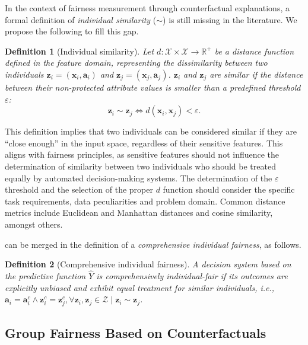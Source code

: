 \documentclass[letterpaper]{article} %
\newtheorem{definition}{Definition}
\begin{document}
In the context of fairness measurement through counterfactual explanations, a formal definition of \emph{individual similarity} ($\sim$) is still missing in the literature. We propose the following to fill this gap.
%
\begin{definition}[Individual similarity]\label{similar_individuals}
	Let $d: \mathcal{X} \times \mathcal{X} \rightarrow \mathbb{R}^{+}$ be a distance function defined in the feature domain, representing the dissimilarity between two individuals $\boldsymbol{z}_i = (\boldsymbol{x}_i, \boldsymbol{a}_i)$ and $\boldsymbol{z}_j = (\boldsymbol{x}_j, \boldsymbol{a}_j)$.
	$\boldsymbol{z}_i$ and $\boldsymbol{z}_j$ are similar if the distance between their non-protected attribute values is smaller than a predefined threshold $\varepsilon$:
	$$ \boldsymbol{z}_i \sim \boldsymbol{z}_j \iff d(\boldsymbol{x}_i, \boldsymbol{x}_j) < \varepsilon. $$
\end{definition}
%
\noindent This definition implies that two individuals can be considered similar if they are ``close enough'' in the input space, regardless of their sensitive features. This aligns with fairness principles, as sensitive features should not influence the determination of similarity between two individuals who should be treated equally by automated decision-making systems.
%
The determination of the $\varepsilon$ threshold and the selection of the proper $d$ function should consider the specific task requirements, data peculiarities and problem domain. Common distance metrics include Euclidean and Manhattan distances and cosine similarity, amongst others.

 can be merged in the definition of a \emph{comprehensive individual fairness}, as follows.
%
\begin{definition}[Comprehensive individual fairness]\label{comprehensive}
	A decision system based on the predictive function $\hat{Y}$ is \emph{comprehensively individual-fair} if its outcomes are explicitly unbiased and exhibit equal treatment for similar individuals, i.e., $\boldsymbol{a}_i = \boldsymbol{a}_i^c \wedge \boldsymbol{z}_i^c = \boldsymbol{z}_j^c, \forall \boldsymbol{z}_i, \boldsymbol{z}_j \in \mathcal{Z} \mid \boldsymbol{z}_i \sim \boldsymbol{z}_j$.
\end{definition}

\subsection{Group Fairness Based on Counterfactuals}
\end{document}
